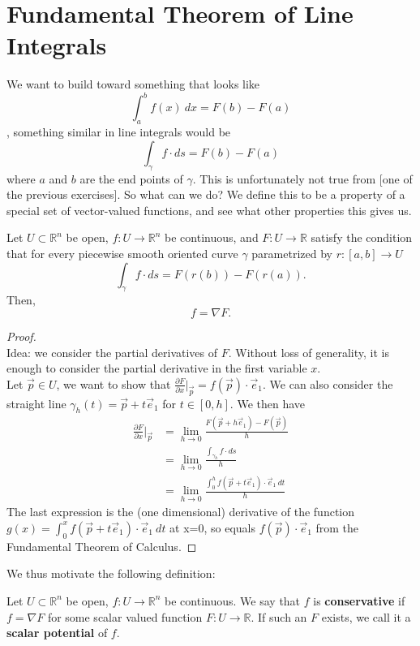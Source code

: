 \documentclass[11pt,openany]{book}
\newcommand{\definition}[2]{\begin{tcolorbox}[title=Definition ({#1}),colframe=black]{#2}\end{tcolorbox}
}
\newcommand{\proposition}[1]{\begin{tcolorbox}[title=Proposition,colframe=red!50!blue!20!white,colback=red!35!blue!10!white, coltitle=black]{#1}\end{tcolorbox}
}
\begin{document}
	\section*{Fundamental Theorem of Line Integrals}
	We want to build toward something that looks like 
	\[
		\int_{a}^{b} f(x) \ dx = F(b) - F(a)
	\], something similar in line integrals would be \[
		\int_\gamma f \cdot ds = F(b) - F(a)
	\] where $a$ and $b$ are the end points of $\gamma$. This is unfortunately not true from [one of the previous exercises]. So what can we do? We define this to be a property of a special set of vector-valued functions, and see what other properties this gives us.
	
	
	\proposition{
		Let $U\subset\mathbb{R}^n$ be open, $f:U\to\mathbb{R}^n$ be continuous, and $F:U\to\mathbb{R}$ satisfy the condition that for every piecewise smooth oriented curve $\gamma$ parametrized by $r: [a,b]\to U$
		\[
		\int_\gamma f \cdot ds = F(r(b)) - F(r(a)).
		\] 
		Then, \[
			f = \nabla F.
		\]
	}
	\begin{proof} \ \\
		Idea: we consider the partial derivatives of $F$. Without loss of generality, it is enough to consider the partial derivative in the first variable $x$. \\
		Let $\vec{p} \in U$, we want to show that $\frac{\partial F}{\partial x} \big| _{\vec{p}} = f(\vec{p}) \cdot \vec{e}_1$. We can also consider the straight line $\gamma_h(t) = \vec{p} + t\vec{e}_1$ for $t\in[0,h]$. We then have \begin{align*}
			\frac{\partial F}{\partial x} \big| _{\vec{p}} &= \lim_{h\to 0} \frac{F(\vec{p}+h\vec{e}_1)-F(\vec{p})}{h} \\
			&= \lim_{h\to 0} \frac{\int_{\gamma_h} f \cdot ds}{h}\\
			&= \lim_{h\to 0} \frac{\int_0^h f(\vec{p}+t\vec{e}_1) \cdot \vec{e}_1 \ dt}{h}
		\end{align*}
		The last expression is the (one dimensional) derivative of the function $g(x)=\int_0^x f(\vec{p}+t\vec{e}_1) \cdot \vec{e}_1 \ dt$ at x=0, so equals $f(\vec{p})\cdot \vec{e}_1$ from the Fundamental Theorem of Calculus.
	\end{proof}
	
	We thus motivate the following definition:
	\definition{Conservative Vector Fields}{
		Let $U\subset\mathbb{R}^n$ be open, $f:U\to\mathbb{R}^n$ be continuous. We say that $f$ is \textbf{conservative} if
		$f = \nabla F $ for some scalar valued function $F:U\to\mathbb{R}$.
		If such an $F$ exists, we call it a \textbf{scalar potential} of $f$.
	}
 
\end{document}
